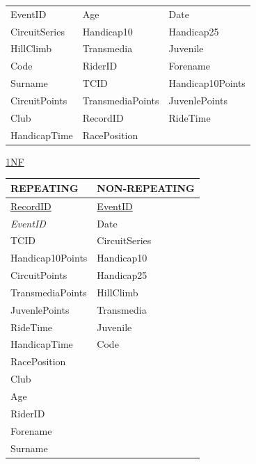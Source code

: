\begin{tabular}{l l l}
EventID       & Age              & Date             \\
CircuitSeries & Handicap10       & Handicap25       \\
HillClimb     & Transmedia       & Juvenile         \\
Code          & RiderID          & Forename         \\
Surname       & TCID             & Handicap10Points \\
CircuitPoints & TransmediaPoints & JuvenlePoints    \\
 Club         & RecordID         & RideTime         \\
HandicapTime  & RacePosition     &                  \\
\end{tabular}

\underline{1NF}

\begin{tabular}{|l|l|}
\hline
REPEATING            & NON-REPEATING       \\ \hline
\underline{RecordID} & \underline{EventID} \\ \hline
\emph{EventID}       & Date                \\ \hline
TCID                 & CircuitSeries       \\ \hline
Handicap10Points     & Handicap10          \\ \hline
CircuitPoints        & Handicap25          \\ \hline 
TransmediaPoints     & HillClimb           \\ \hline 
JuvenlePoints        & Transmedia          \\ \hline
RideTime             & Juvenile            \\ \hline 
HandicapTime         & Code                \\ \hline
RacePosition         &                     \\ \hline
Club                 &                     \\ \hline
Age                  &                     \\ \hline
RiderID              &                     \\ \hline
Forename             &                     \\ \hline
Surname              &                     \\ \hline
\end{tabular}



